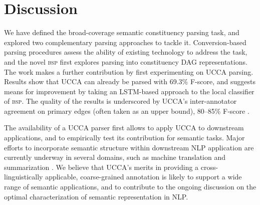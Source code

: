 \documentclass[11pt]{article}
\begin{document}
\section{Discussion}\label{sec:discussion}

We have defined the broad-coverage semantic constituency parsing task,
and explored two complementary parsing approaches to tackle it.
Conversion-based parsing procedures assess the ability of existing
technology to address the task, and the novel \textsc{bsp} first
explores parsing into constituency DAG representations.
The work makes a further contribution by first experimenting on UCCA parsing.
Results show that UCCA can already be parsed with 69.3\% F-score,
and suggests means for improvement by taking an LSTM-based
approach to the local classifier of \textsc{bsp}.
The quality of the results is underscored by UCCA's inter-annotator
agreement on primary edges (often taken as an upper bound),
80--85\% F-score \cite{abend2013universal}.



The availability of a UCCA parser first allows to apply UCCA to
downstream applications, and to empirically test its contribution for semantic tasks.
Major efforts to incorporate semantic structure within downstream NLP application
are currently underway in several domains,
such as machine translation \cite{jones2012semantics} and summarization \cite{liu2015toward}.
We believe that UCCA's merits in providing a cross-linguistically applicable, coarse-grained
annotation is likely to support a wide range of semantic applications, and to contribute to
the ongoing discussion on the optimal characterization of semantic representation in NLP.
\end{document}
